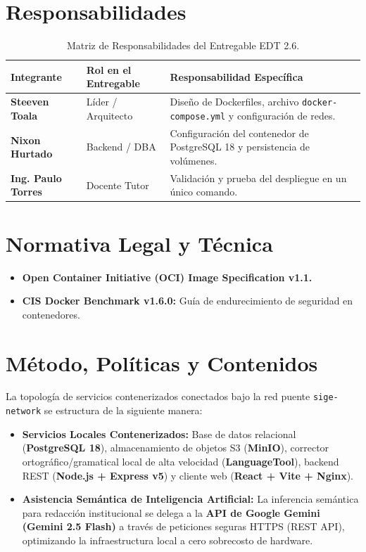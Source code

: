 \documentclass[12pt,a4paper]{article}
\begin{document}
\section{Responsabilidades}
\begin{table}[htbp]
\centering
\small
\begin{tabularx}{\textwidth}{|>{\hsize=0.65\hsize\bfseries}X|>{\hsize=0.85\hsize}X|>{\hsize=1.5\hsize}X|}
    \hline
    \rowcolor{tableheader}
    Integrante & Rol en el Entregable & Responsabilidad Específica \\
    \hline
    Steeven Toala & Líder / Arquitecto & Diseño de Dockerfiles, archivo \texttt{docker-compose.yml} y configuración de redes. \\
    \hline
    Nixon Hurtado & Backend / DBA & Configuración del contenedor de PostgreSQL 18 y persistencia de volúmenes. \\
    \hline
    Ing. Paulo Torres & Docente Tutor & Validación y prueba del despliegue en un único comando. \\
    \hline
\end{tabularx}
\caption{Matriz de Responsabilidades del Entregable EDT 2.6.}
\end{table}

\section{Normativa Legal y Técnica}
\begin{itemize}[leftmargin=1.5em, itemsep=2pt]
    \item \textbf{Open Container Initiative (OCI) Image Specification v1.1.}
    \item \textbf{CIS Docker Benchmark v1.6.0:} Guía de endurecimiento de seguridad en contenedores.
\end{itemize}

\section{Método, Políticas y Contenidos}
La topología de servicios contenerizados conectados bajo la red puente \texttt{sige-network} se estructura de la siguiente manera:

\begin{itemize}[leftmargin=1.5em, itemsep=2pt]
    \item \textbf{Servicios Locales Contenerizados:} Base de datos relacional (\textbf{PostgreSQL 18}), almacenamiento de objetos S3 (\textbf{MinIO}), corrector ortográfico/gramatical local de alta velocidad (\textbf{LanguageTool}), backend REST (\textbf{Node.js + Express v5}) y cliente web (\textbf{React + Vite + Nginx}).
    \item \textbf{Asistencia Semántica de Inteligencia Artificial:} La inferencia semántica para redacción institucional se delega a la \textbf{API de Google Gemini (Gemini 2.5 Flash)} a través de peticiones seguras HTTPS (REST API), optimizando la infraestructura local a cero sobrecosto de hardware.
\end{itemize}
\end{document}
